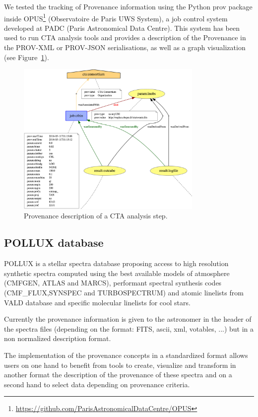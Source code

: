 We tested the tracking of Provenance information using the Python prov package inside OPUS\footnote{\url{https://github.com/ParisAstronomicalDataCentre/OPUS}} (Observatoire de Paris UWS System), a job control system developed at PADC (Paris Astronomical Data Centre). This system has been used to run CTA analysis tools and provides a description of the Provenance in the PROV-XML or PROV-JSON serialisations, as well as a graph visualization (see Figure~\ref{fig:cta_prov}).

\begin{figure}
\centering
\includegraphics[width=0.8\textwidth]{CTA_prov.png}
\caption{Provenance description of a CTA analysis step.}
\label{fig:cta_prov}
\end{figure}


\subsection{POLLUX database}

POLLUX is a stellar spectra database proposing access to high resolution synthetic spectra computed using the best available models of atmosphere (CMFGEN, ATLAS and MARCS), performant spectral synthesis codes (CMF\_FLUX,SYNSPEC and TURBOSPECTRUM) and atomic linelists from VALD database and specific molecular linelists for cool stars. 

Currently the provenance information is given to the astronomer in the header of the spectra files (depending on the format: FITS, ascii, xml, votables, ...) but in a non normalized description format. 

The implementation of the provenance concepts in a standardized format allows users on one hand to benefit from tools to create, visualize and transform in another format the description of the provenance of these spectra and on a second hand to select data depending on provenance criteria.

